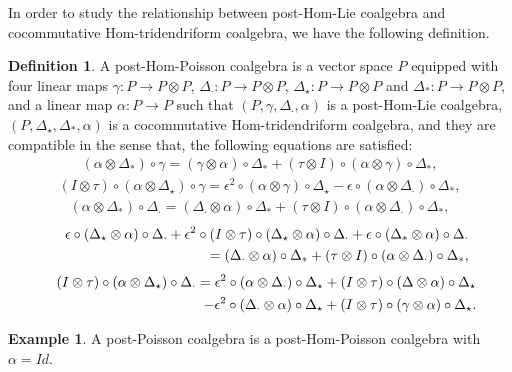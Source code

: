 \documentclass{article}
\theoremstyle{definition}
\newtheorem{defn}[thm]{Definition}
\newtheorem{exam}[thm]{Example}
\theoremstyle{remark}
\numberwithin{equation}{section}
\begin{document}
In order to study the relationship between post-Hom-Lie coalgebra and cocommutative Hom-tridendriform coalgebra, we have the following definition.
\begin{defn}\label{hppad}
 A post-Hom-Poisson coalgebra is a vector space $P$ equipped with four linear maps
$\gamma : P\rightarrow P\otimes P$, $\Delta_\cdot : P\rightarrow P\otimes P$, $\Delta_\star :  P\rightarrow P\otimes P$ and $\Delta_\ast :  P\rightarrow P\otimes P$,
 and a linear map $\alpha : P\rightarrow P$ such that $(P, \gamma, \Delta_\cdot, \alpha)$ is a post-Hom-Lie coalgebra, $(P, \Delta_\star, \Delta_\ast, \alpha)$
is a cocommutative Hom-tridendriform coalgebra, and they are compatible in the sense that, the following equations are satisfied:
\begin{eqnarray}
 (\alpha\otimes\Delta_\ast)\circ\gamma=(\gamma\otimes\alpha)\circ\Delta_\ast +(\tau\otimes I)\circ(\alpha\otimes\gamma)\circ\Delta_\ast,\label{p1}
\end{eqnarray}
\begin{eqnarray}
 (I\otimes\tau)\circ(\alpha\otimes\Delta_\star)\circ\gamma=\epsilon^2\circ(\alpha\otimes\gamma)\circ\Delta_\star-\epsilon\circ(\alpha\otimes\Delta_\cdot)\circ\Delta_\ast,\label{p2}
\end{eqnarray}
\begin{eqnarray}
 (\alpha\otimes\Delta_\ast)\circ\Delta_\cdot=(\Delta_\cdot\otimes\alpha)\circ\Delta_\ast+(\tau\otimes I)\circ(\alpha\otimes\Delta_\cdot)\circ\Delta_\ast,\label{p3}
\end{eqnarray}
\begin{eqnarray}
&&\epsilon\circ(\Delta_\star\otimes\alpha)\circ\Delta_\cdot + \epsilon^2\circ(I\otimes\tau)\circ(\Delta_\star\otimes\alpha)\circ\Delta_\cdot+\epsilon\circ(\Delta_\ast\otimes\alpha)\circ\Delta_\cdot
\cr
&&=(\Delta_\cdot\otimes\alpha)\circ\Delta_\ast+(\tau\otimes I)\circ(\alpha\otimes\Delta_\cdot)\circ\Delta_\ast,\label{p4}
\end{eqnarray}
\begin{eqnarray}
&&(I\otimes\tau)\circ(\alpha\otimes\Delta_\star)\circ\Delta_\cdot=\epsilon^2\circ(\alpha\otimes\Delta_\cdot)\circ\Delta_\star+(I\otimes\tau)\circ(\Delta\otimes\alpha)\circ\Delta_\star\cr
&&-\epsilon^2\circ(\Delta_\cdot\otimes\alpha)\circ\Delta_\star+(I\otimes\tau)\circ(\gamma\otimes\alpha)\circ\Delta_\star.\label{p5}
\end{eqnarray}
\end{defn}
\begin{exam}
 A post-Poisson coalgebra is a post-Hom-Poisson coalgebra with $\alpha=Id$.
\end{exam}
\end{document}
